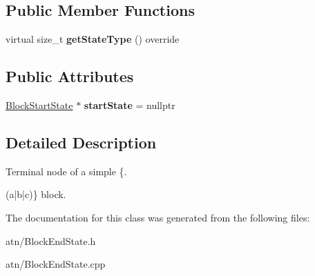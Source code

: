 \subsection*{Public Member Functions}
\begin{DoxyCompactItemize}
\item 
\mbox{\label{classantlr4_1_1atn_1_1BlockEndState_a37596e80fdf84b222c77c51ec343b56e}} 
virtual size\+\_\+t {\bfseries get\+State\+Type} () override
\end{DoxyCompactItemize}
\subsection*{Public Attributes}
\begin{DoxyCompactItemize}
\item 
\mbox{\label{classantlr4_1_1atn_1_1BlockEndState_a98fb9ca9e750f16d2e961fcd2ef79dee}} 
\hyperlink{classantlr4_1_1atn_1_1BlockStartState}{Block\+Start\+State} $\ast$ {\bfseries start\+State} = nullptr
\end{DoxyCompactItemize}


\subsection{Detailed Description}
Terminal node of a simple \{. 


\begin{DoxyCode}
(a|b|c)\} block. 
\end{DoxyCode}


The documentation for this class was generated from the following files\+:\begin{DoxyCompactItemize}
\item 
atn/Block\+End\+State.\+h\item 
atn/Block\+End\+State.\+cpp\end{DoxyCompactItemize}
